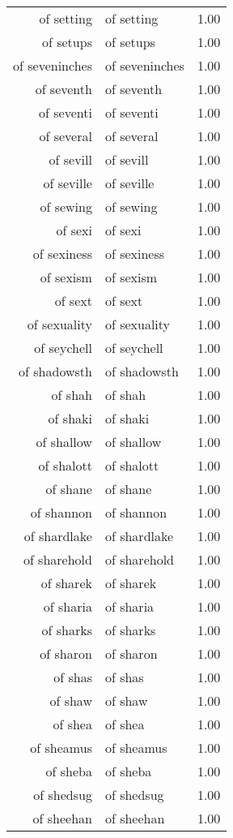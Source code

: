 \begin{table}[ht]
\begin{tabular}{rlr}
  of setting & of setting & 1.00 \\ 
  of setups & of setups & 1.00 \\ 
  of seveninches & of seveninches & 1.00 \\ 
  of seventh & of seventh & 1.00 \\ 
  of seventi & of seventi & 1.00 \\ 
  of several & of several & 1.00 \\ 
  of sevill & of sevill & 1.00 \\ 
  of seville & of seville & 1.00 \\ 
  of sewing & of sewing & 1.00 \\ 
  of sexi & of sexi & 1.00 \\ 
  of sexiness & of sexiness & 1.00 \\ 
  of sexism & of sexism & 1.00 \\ 
  of sext & of sext & 1.00 \\ 
  of sexuality & of sexuality & 1.00 \\ 
  of seychell & of seychell & 1.00 \\ 
  of shadowsth & of shadowsth & 1.00 \\ 
  of shah & of shah & 1.00 \\ 
  of shaki & of shaki & 1.00 \\ 
  of shallow & of shallow & 1.00 \\ 
  of shalott & of shalott & 1.00 \\ 
  of shane & of shane & 1.00 \\ 
  of shannon & of shannon & 1.00 \\ 
  of shardlake & of shardlake & 1.00 \\ 
  of sharehold & of sharehold & 1.00 \\ 
  of sharek & of sharek & 1.00 \\ 
  of sharia & of sharia & 1.00 \\ 
  of sharks & of sharks & 1.00 \\ 
  of sharon & of sharon & 1.00 \\ 
  of shas & of shas & 1.00 \\ 
  of shaw & of shaw & 1.00 \\ 
  of shea & of shea & 1.00 \\ 
  of sheamus & of sheamus & 1.00 \\ 
  of sheba & of sheba & 1.00 \\ 
  of shedsug & of shedsug & 1.00 \\ 
  of sheehan & of sheehan & 1.00 \\ 

\end{tabular}
\end{table}
